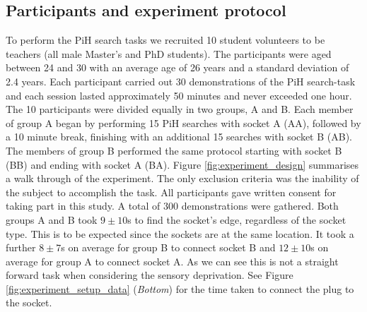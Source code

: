 \documentclass[final,5p,times,twocolumn]{elsarticle}
\begin{document}
\subsection{Participants and experiment protocol}

To perform the PiH search tasks we recruited 10 student volunteers to be teachers (all male Master's and PhD students).
The participants were aged between 24 and 30 with an average age of 26 years and a standard deviation of 2.4 years.
Each participant carried out 30 demonstrations of the PiH search-task and each session lasted approximately 50 minutes and 
never exceeded one hour. The 10 participants were divided equally in two groups, A and B. Each member of group A began 
by performing 15 PiH searches with socket A (AA), followed by a 10 minute break, finishing with an additional 15 searches with socket B (AB). 
The members of group B performed the same protocol starting with socket B (BB) and ending with socket A (BA).
Figure \ref{fig:experiment_design} summarises a walk through of the experiment.
The only exclusion criteria was the inability of the subject to accomplish the task. All participants gave written consent 
for taking part in this study. A total of 300 demonstrations were gathered.
Both groups A and B took $9\pm10$s to find the socket's edge, regardless of the socket type. This is to be expected since the sockets 
are at the same location. It took a further $8\pm7$s on average for group B to connect
socket B and $12\pm10$s on average for group A to connect socket A. As we can see this is not a straight forward task when considering
the sensory deprivation. See Figure \ref{fig:experiment_setup_data} (\textit{Bottom}) for the time taken to connect the plug to the socket.

\end{document}
